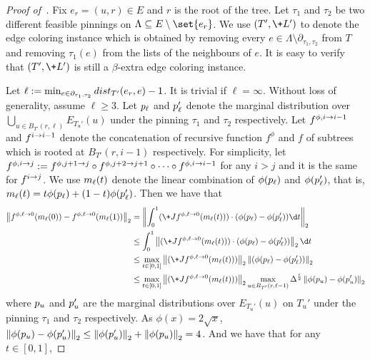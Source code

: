 \begin{proof}[Proof of~]
Fix $e_r = (u, r)\in E$ and $r$ is the root of the tree.
Let $\tau_1$ and $\tau_2$ be two different feasible pinnings on $\Lambda \subseteq E\setminus \set{e_r}$.
We use $(T',\+L')$ to denote the edge coloring instance which is obtained by removing every $e\in \Lambda \setminus \partial_{\tau_1,\tau_2}$ from $T$ and removing $\tau_1(e)$ from the lists of the neighbours of $e$. It is easy to verify that $(T',\+L')$ is still a $\beta$-extra edge coloring instance.

Let $\ell := \min_{e\in \partial_{\tau_1,\tau_2}} \-{dist}_{T'}(e_r,e) - 1$.
It is trivial if $\ell = \infty$.
Without loss of generality, assume $\ell \geq 3$.
Let $\*p_\ell$ and $\*p_\ell'$ denote the marginal distribution over $\bigcup_{u\in B_{T'}(r,\ell)} E_{T_u'}(u)$ under the pinning $\tau_1$ and $\tau_2$ respectively.
Let $f^{\phi,i\rightarrow i-1}$ and $f^{i\rightarrow i-1}$ denote the concatenation of recursive function $f^\phi$ and $f$ of subtrees which is rooted at $B_{T'}(r, i-1)$ respectively.
For simplicity, let $f^{\phi,i\rightarrow j} := f^{\phi,j+1\rightarrow j} \circ f^{\phi,j+2\rightarrow j+1} \circ \dots \circ f^{\phi,i\rightarrow i-1}$ for any $i > j$ and it is the same for $f^{i\rightarrow j}$.
We use $\*m_\ell(t)$ denote the linear combination of  $\phi(\*p_\ell)$ and $\phi(\*p_\ell')$, that is,
$\*m_\ell(t) = t\phi(\*p_\ell) + (1-t) \phi(\*p_\ell')$.
Then we have that
\begin{align}
    \nonumber \norm{f^{\phi,\ell\ra 0}(\*m_\ell(0)) - f^{\phi,\ell\ra 0}(\*m_\ell(1))}_2
    &= \norm{\int_0^1 (\+J f^{\phi,\ell\ra 0}(\*m_\ell(t))) \cdot (\phi(\*p_\ell) - \phi(\*p_\ell')) \d t}_2
    \\\nonumber &\leq \int_0^1 \norm{ (\+J f^{\phi,\ell\ra 0}(\*m_\ell(t))) \cdot (\phi(\*p_\ell) - \phi(\*p_\ell')) }_2\d t
    \\\nonumber &\leq \max_{t\in[0,1]} \norm{ (\+J f^{\phi,\ell\ra 0}(\*m_\ell(t)))}_2\norm{(\phi(\*p_\ell) - \phi(\*p_\ell')) }_2
    \\ \label{eq:contraction} &\leq \max_{t\in[0,1]} \norm{ (\+J f^{\phi,\ell\ra 0}(\*m_\ell(t)))}_2
    \max_{u\in B_{T'}(r,\ell-1)}\Delta^{\frac{\ell}{2}}\norm{\phi(\*p_u) - \phi(\*p_u')}_2
\end{align}
where $\*p_u$ and $\*p_u'$ are the marginal distributions over $E_{T_u'}(u)$ on $T_u'$ under the pinning $\tau_1$ and $\tau_2$ respectively.
As $\phi(x) = 2\sqrt{x}$, $\norm{\phi(\*p_u) - \phi(\*p_u')}_2 \leq \norm{\phi(\*p_u')}_2 + \norm{\phi(\*p_u)}_2 = 4$.
And we have that for any $t\in [0,1]$,

\end{proof}
